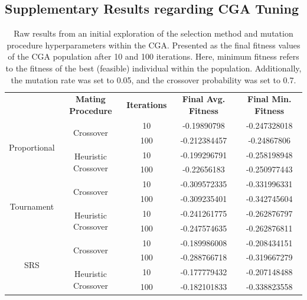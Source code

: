 \documentclass[10pt]{article}
\begin{document}
\subsection{Supplementary Results regarding CGA Tuning}

\begin{table}[H]
    \centering
    \begin{tabular}{|*{5}{c|}}
        \hline
        \renewcommand{\arraystretch}{1.5}
        \multirow{2}{*}{\textbf{Selection Method}} & \multirow{2}{*}{\textbf{Mating Procedure}} & \multirow{2}{*}{\textbf{Iterations}} & \multirow{2}{*}{\textbf{Final Avg. Fitness}} & \multirow{2}{*}{\textbf{Final Min. Fitness}} \\
        & & & & \\
        \hline
        \multirow{4}{*}{Proportional} & \multirow{2}{*}{Crossover} & 10 & -0.19890798 & -0.247328018 \\
        & &\cellcolor{lightgray} 100 &\cellcolor{lightgray} -0.212384457 &\cellcolor{lightgray} -0.24867806 \\
        \cline{2-5}
        & \multirow{2}{*}{Heuristic Crossover} & 10 & -0.199296791 & -0.258198948 \\
        & &\cellcolor{lightgray} 100 &\cellcolor{lightgray} -0.22656183 & \cellcolor{lightgray} -0.250977443 \\
        \hline
        \multirow{4}{*}{Tournament} & \multirow{2}{*}{Crossover} & 10 & -0.309572335 & -0.331996331 \\
        & &\cellcolor{lightgray} 100 &\cellcolor{lightgray} -0.309235401 &\cellcolor{lightgray} -0.342745604 \\
        \cline{2-5}
        & \multirow{2}{*}{Heuristic Crossover} & 10 & -0.241261775 & -0.262876797 \\
        & &\cellcolor{lightgray} 100 &\cellcolor{lightgray} -0.247574635 &\cellcolor{lightgray} -0.262876811 \\
        \hline
        \multirow{4}{*}{SRS} & \multirow{2}{*}{Crossover} & 10 & -0.189986008 & -0.208434151 \\
        & &\cellcolor{lightgray} 100 &\cellcolor{lightgray} -0.288766718 &\cellcolor{lightgray} -0.319667279 \\
        \cline{2-5}
        & \multirow{2}{*}{Heuristic Crossover} & 10 & -0.177779432 & -0.207148488 \\
        & &\cellcolor{lightgray} 100 &\cellcolor{lightgray} -0.182101833 &\cellcolor{lightgray} -0.338823558 \\
        \hline
    \end{tabular}
    \captionsetup{justification=centering}
    \caption{Raw results from an initial exploration of the selection method and mutation procedure hyperparameters within the CGA. Presented as the final fitness values of the CGA population after 10 and 100 iterations. Here, minimum fitness refers to the fitness of the best (feasible) individual within the population. Additionally, the mutation rate was set to 0.05, and the crossover probability was set to 0.7.}
    \label{tab:CGAexploration}
\end{table}
\end{document}
